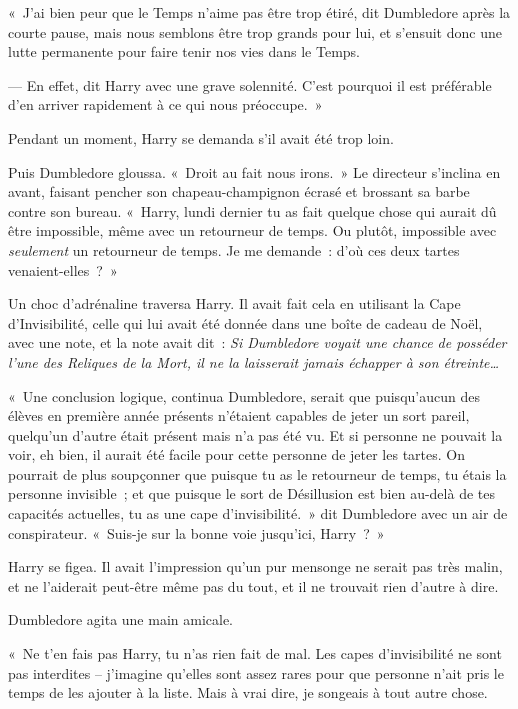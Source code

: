 «~J'ai bien peur que le Temps n'aime pas être trop étiré, dit Dumbledore après la courte pause, mais nous semblons être trop grands pour lui, et s'ensuit donc une lutte permanente pour faire tenir nos vies dans le Temps.

--- En effet, dit Harry avec une grave solennité. C'est pourquoi il est préférable d'en arriver rapidement à ce qui nous préoccupe.~»

Pendant un moment, Harry se demanda s'il avait été trop loin.

Puis Dumbledore gloussa. «~Droit au fait nous irons.~» Le directeur s'inclina en avant, faisant pencher son chapeau-champignon écrasé et brossant sa barbe contre son bureau. «~Harry, lundi dernier tu as fait quelque chose qui aurait dû être impossible, même avec un retourneur de temps. Ou plutôt, impossible avec \emph{seulement} un retourneur de temps. Je me demande~: d'où ces deux tartes venaient-elles~?~»

Un choc d'adrénaline traversa Harry. Il avait fait cela en utilisant la Cape d'Invisibilité, celle qui lui avait été donnée dans une boîte de cadeau de Noël, avec une note, et la note avait dit~: \emph{Si Dumbledore voyait une chance de posséder l'une des Reliques de la Mort, il ne la laisserait jamais échapper à son étreinte…}

«~Une conclusion logique, continua Dumbledore, serait que puisqu'aucun des élèves en première année présents n'étaient capables de jeter un sort pareil, quelqu'un d'autre était présent mais n'a pas été vu. Et si personne ne pouvait la voir, eh bien, il aurait été facile pour cette personne de jeter les tartes. On pourrait de plus soupçonner que puisque tu as le retourneur de temps, tu étais la personne invisible~; et que puisque le sort de Désillusion est bien au-delà de tes capacités actuelles, tu as une cape d'invisibilité.~» dit Dumbledore avec un air de conspirateur. «~Suis-je sur la bonne voie jusqu'ici, Harry~?~»

Harry se figea. Il avait l'impression qu'un pur mensonge ne serait pas très malin, et ne l'aiderait peut-être même pas du tout, et il ne trouvait rien d'autre à dire.

Dumbledore agita une main amicale.

«~Ne t'en fais pas Harry, tu n'as rien fait de mal. Les capes d'invisibilité ne sont pas interdites -- j'imagine qu'elles sont assez rares pour que personne n'ait pris le temps de les ajouter à la liste. Mais à vrai dire, je songeais à tout autre chose.

